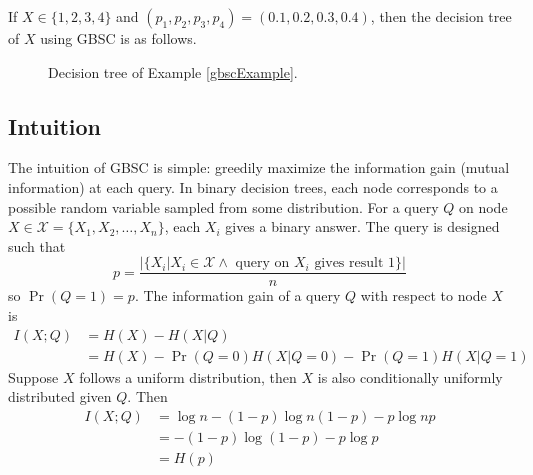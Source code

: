 \begin{example}
\label{gbscExample}
If $X\in\{1,2,3,4\}$ and $(p_1,p_2,p_3,p_4)=(0.1,0.2,0.3,0.4)$, then the decision tree of $X$ using GBSC is as follows.

\begin{figure}[H]
    \centering
    \caption{Decision tree of Example \ref{gbscExample}.}
\end{figure}

\end{example}

\subsection{Intuition}
The intuition of GBSC is simple: greedily maximize the information gain (mutual information) at each query. In binary decision trees, each node corresponds to a possible random variable sampled from some distribution. For a query $Q$ on node $X\in \mathcal{X} = \{X_1,X_2,\dots, X_n\}$, each $X_i$ gives a binary answer.
The query is designed such that 
$$
p = \frac{| \{X_i|X_i\in \mathcal{X}  \wedge \text{ query on } X_i \text{ gives result 1} \}|} {n}
$$
so $\Pr(Q=1) = p$. 
The information gain of a query $Q$ with respect to node $X$ is 
$$
\begin{aligned}
I(X;Q) &= H(X) - H(X|Q) \\
&= H(X) - \Pr(Q=0) H(X|Q=0) - \Pr(Q=1)H(X|Q=1)
\end{aligned}
$$
Suppose $X$ follows a uniform distribution, then $X$ is also conditionally uniformly distributed given $Q$. Then 
$$
\begin{aligned}
I(X;Q)&=\log n- (1-p)\log n(1-p) - p\log np \\
&= -(1-p)\log (1-p) - p\log p \\
&= H(p)
\end{aligned}
$$

